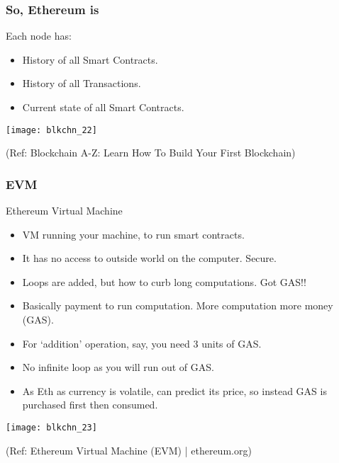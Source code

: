 \begin{frame}[fragile]\frametitle{So, Ethereum is}
Each node has:
\begin{itemize}
\item History of all Smart Contracts.
\item History of all Transactions.
\item Current state of all Smart Contracts.
\end{itemize}

\begin{center}
\texttt{[image: blkchn\_22]}

{\tiny (Ref: Blockchain A-Z: Learn How To Build Your First Blockchain)}
\end{center}

\end{frame}

\begin{frame}[fragile]\frametitle{EVM}
Ethereum Virtual Machine

\begin{itemize}
\item VM running your machine, to run smart contracts.
\item It has no access to outside world on the computer. Secure.
\item Loops are added, but how to curb long computations. Got GAS!!
\item Basically payment to run computation. More computation more money (GAS). 
\item For `addition' operation, say, you need 3 units of GAS.
\item No infinite loop as you will run out of GAS.
\item As Eth as currency is volatile, can predict its price, so instead GAS is purchased first then consumed.
\end{itemize}

\begin{center}
\texttt{[image: blkchn\_23]}

{\tiny (Ref: Ethereum Virtual Machine (EVM) | ethereum.org)}
\end{center}

\end{frame}

